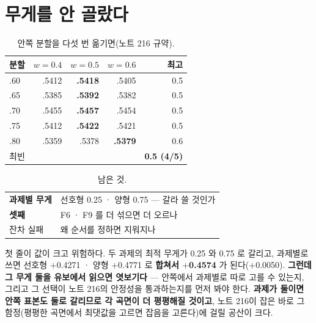\documentclass[10pt]{article}
\begin{document}
\section{무게를 안 골랐다}

\begin{table}[t]
\centering\tsize
\caption{안쪽 분할을 다섯 번 옮기면(노트 216 규약).}
\begin{tabular}{lrrrr}
\toprule
분할 & $w{=}0.4$ & $w{=}0.5$ & $w{=}0.6$ & 최고 \\
\midrule
.60 & .5412 & \textbf{.5418} & .5405 & 0.5 \\
.65 & .5385 & \textbf{.5392} & .5382 & 0.5 \\
.70 & .5455 & \textbf{.5457} & .5454 & 0.5 \\
.75 & .5412 & \textbf{.5422} & .5421 & 0.5 \\
.80 & .5359 & .5378 & \textbf{.5379} & 0.6 \\
\midrule
\multicolumn{4}{l}{최빈} & \textbf{0.5 (4/5)} \\
\bottomrule
\end{tabular}
\end{table}


\begin{table}[t]
\centering\tsize
\caption{남은 것.}
\begin{tabular}{ll}
\toprule
\textbf{과제별 무게} & 선호형 0.25 · 양형 0.75 --- 갈라 쓸 것인가 \\
\textbf{셋째} & F6 · F9 를 더 섞으면 더 오르나 \\
잔차 실패 & 왜 순서를 정하면 지워지나 \\
\bottomrule
\end{tabular}
\end{table}

첫 줄이 값이 크고 위험하다. 두 과제의 최적 무게가 0.25 와 0.75 로 갈리고,
과제별로 쓰면 선호형 $+$0.4271 · 양형 $+$0.4771 로 \textbf{합쳐서
$+$0.4574} 가 된다($+$0.0050). \textbf{그런데 그 무게 둘을 유보에서
읽으면 엿보기다} --- 안쪽에서 과제별로 따로 고를 수 있는지, 그리고 그
선택이 노트 216의 안정성을 통과하는지를 먼저 봐야 한다. \textbf{과제가
둘이면 안쪽 표본도 둘로 갈리므로 각 곡면이 더 평평해질 것이고}, 노트 216이
잡은 바로 그 함정(평평한 곡면에서 최댓값을 고르면 잡음을 고른다)에 걸릴
공산이 크다.
\end{document}
